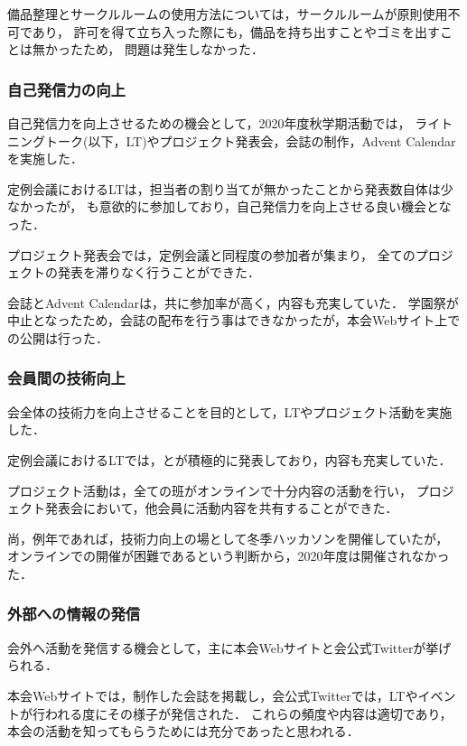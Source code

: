     備品整理とサークルルームの使用方法については，サークルルームが原則使用不可であり，
    許可を得て立ち入った際にも，備品を持ち出すことやゴミを出すことは無かったため，
    問題は発生しなかった．

\subsubsection*{自己発信力の向上}
    自己発信力を向上させるための機会として，2020年度秋学期活動では，
    ライトニングトーク(以下，LT)やプロジェクト発表会，会誌の制作，Advent Calendarを実施した．

    定例会議におけるLTは，担当者の割り当てが無かったことから発表数自体は少なかったが，
    \firstGrade{}も意欲的に参加しており，自己発信力を向上させる良い機会となった．

    プロジェクト発表会では，定例会議と同程度の参加者が集まり，
    全てのプロジェクトの発表を滞りなく行うことができた．

    会誌とAdvent Calendarは，共に参加率が高く，内容も充実していた．
    学園祭が中止となったため，会誌の配布を行う事はできなかったが，本会Webサイト上での公開は行った．

\subsubsection*{会員間の技術向上}
    会全体の技術力を向上させることを目的として，LTやプロジェクト活動を実施した．

    定例会議におけるLTでは，\firstGrade{}と\secondGrade{}が積極的に発表しており，内容も充実していた．

    プロジェクト活動は，全ての班がオンラインで十分内容の活動を行い，
    プロジェクト発表会において，他会員に活動内容を共有することができた．

    尚，例年であれば，技術力向上の場として冬季ハッカソンを開催していたが，
    オンラインでの開催が困難であるという判断から，2020年度は開催されなかった．

\subsubsection*{外部への情報の発信}
    会外へ活動を発信する機会として，主に本会Webサイトと会公式Twitterが挙げられる．

    本会Webサイトでは，制作した会誌を掲載し，会公式Twitterでは，LTやイベントが行われる度にその様子が発信された．
    これらの頻度や内容は適切であり，本会の活動を知ってもらうためには充分であったと思われる．
